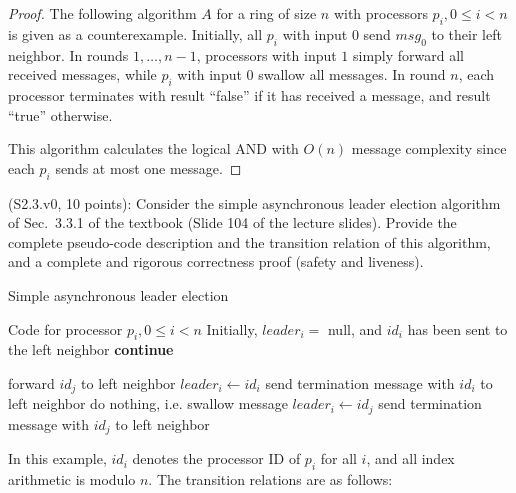 \begin{proof}
The following algorithm $A$ for a ring of size $n$ with processors $p_i, 0 \leq i < n$
is given as a counterexample. 
Initially, all $p_i$ with input $0$ send $msg_0$ to their
left neighbor.
In rounds $1, \ldots, n-1$, processors with input $1$ simply forward all received
messages, while $p_i$ with input $0$ swallow all messages. In round $n$,
each processor terminates with result ``false'' if it has received a message, and
result ``true'' otherwise.

This algorithm calculates the logical AND with $O(n)$ message complexity since
each $p_i$ sends at most one message.
\end{proof}


\begin{Exc}{(S2.3.v0, 10 points):}
Consider the simple asynchronous leader election algorithm of Sec.~3.3.1 of
the textbook (Slide 104 of the lecture slides). Provide the complete
pseudo-code description and the transition relation of this algorithm,
and a complete and rigorous correctness proof (safety and liveness).
\end{Exc}

\begin{algorithm}
\caption{Simple asynchronous leader election} \label{alg:ale}
\begin{algorithmic}[1]
\Statex Code for processor $p_i, 0 \leq i < n$
\Statex Initially, $leader_i = $ null, and $id_i$ has been sent to the left neighbor
        \State \textbf{continue}
    \EndIf

        \State forward $id_j$ to left neighbor
        \State $leader_i \gets id_i$
        \State send termination message with $id_i$ to left neighbor
        \State do nothing, i.e. swallow message
        \State $leader_i \gets id_j$
        \State send termination message with $id_j$ to left neighbor
    \EndIf
\EndFor
\end{algorithmic}
\end{algorithm}

In this example, $id_i$ denotes the processor ID of $p_i$ for all $i$, and all
index arithmetic is modulo $n$.
The transition relations are as follows:

